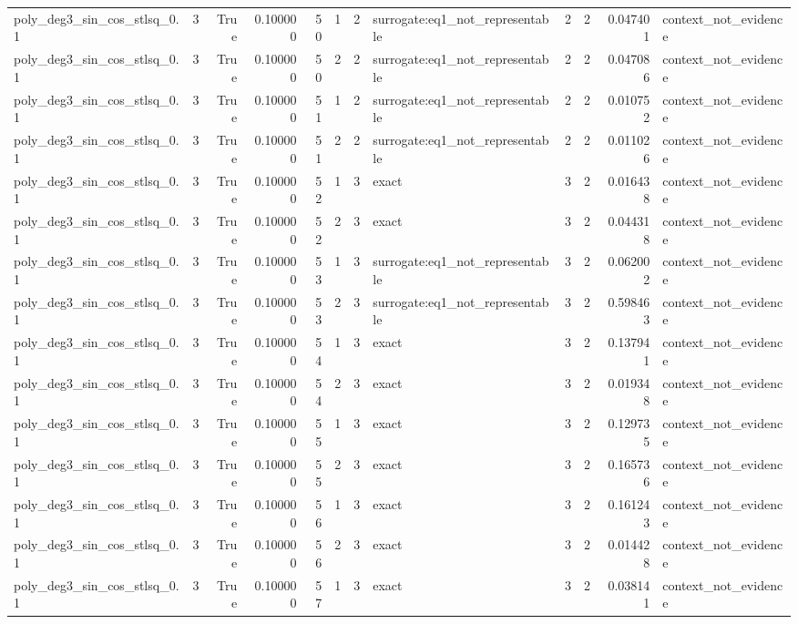 \begin{tabular}{lrrrrrrlrrrl}
poly\_deg3\_sin\_cos\_stlsq\_0.1 & 3 & True & 0.100000 & 50 & 1 & 2 & surrogate:eq1\_not\_representable & 2 & 2 & 0.047401 & context\_not\_evidence \\
poly\_deg3\_sin\_cos\_stlsq\_0.1 & 3 & True & 0.100000 & 50 & 2 & 2 & surrogate:eq1\_not\_representable & 2 & 2 & 0.047086 & context\_not\_evidence \\
poly\_deg3\_sin\_cos\_stlsq\_0.1 & 3 & True & 0.100000 & 51 & 1 & 2 & surrogate:eq1\_not\_representable & 2 & 2 & 0.010752 & context\_not\_evidence \\
poly\_deg3\_sin\_cos\_stlsq\_0.1 & 3 & True & 0.100000 & 51 & 2 & 2 & surrogate:eq1\_not\_representable & 2 & 2 & 0.011026 & context\_not\_evidence \\
poly\_deg3\_sin\_cos\_stlsq\_0.1 & 3 & True & 0.100000 & 52 & 1 & 3 & exact & 3 & 2 & 0.016438 & context\_not\_evidence \\
poly\_deg3\_sin\_cos\_stlsq\_0.1 & 3 & True & 0.100000 & 52 & 2 & 3 & exact & 3 & 2 & 0.044318 & context\_not\_evidence \\
poly\_deg3\_sin\_cos\_stlsq\_0.1 & 3 & True & 0.100000 & 53 & 1 & 3 & surrogate:eq1\_not\_representable & 3 & 2 & 0.062002 & context\_not\_evidence \\
poly\_deg3\_sin\_cos\_stlsq\_0.1 & 3 & True & 0.100000 & 53 & 2 & 3 & surrogate:eq1\_not\_representable & 3 & 2 & 0.598463 & context\_not\_evidence \\
poly\_deg3\_sin\_cos\_stlsq\_0.1 & 3 & True & 0.100000 & 54 & 1 & 3 & exact & 3 & 2 & 0.137941 & context\_not\_evidence \\
poly\_deg3\_sin\_cos\_stlsq\_0.1 & 3 & True & 0.100000 & 54 & 2 & 3 & exact & 3 & 2 & 0.019348 & context\_not\_evidence \\
poly\_deg3\_sin\_cos\_stlsq\_0.1 & 3 & True & 0.100000 & 55 & 1 & 3 & exact & 3 & 2 & 0.129735 & context\_not\_evidence \\
poly\_deg3\_sin\_cos\_stlsq\_0.1 & 3 & True & 0.100000 & 55 & 2 & 3 & exact & 3 & 2 & 0.165736 & context\_not\_evidence \\
poly\_deg3\_sin\_cos\_stlsq\_0.1 & 3 & True & 0.100000 & 56 & 1 & 3 & exact & 3 & 2 & 0.161243 & context\_not\_evidence \\
poly\_deg3\_sin\_cos\_stlsq\_0.1 & 3 & True & 0.100000 & 56 & 2 & 3 & exact & 3 & 2 & 0.014428 & context\_not\_evidence \\
poly\_deg3\_sin\_cos\_stlsq\_0.1 & 3 & True & 0.100000 & 57 & 1 & 3 & exact & 3 & 2 & 0.038141 & context\_not\_evidence \\

\end{tabular}
